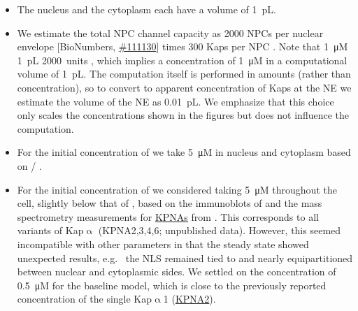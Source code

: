 \documentclass[12pt,notitlepage]{article}
\def\[#1\]{\begin{align}#1\end{align}}
\begin{document}
\begin{itemize}

\item

The nucleus and the cytoplasm each have a volume
of \SI{1}{\pico L}.


\item

We estimate the total NPC channel capacity
as 
2000 NPCs per nuclear envelope
[BioNumbers, \href{https://bionumbers.hms.harvard.edu/bionumber.aspx?id=111130}{\#111130}]
times
300 Kaps per NPC
\cite[\href{https://i.ibb.co/8jdLvn1/Paradise-Levin-Korza-Carson-2007-Fig7.jpg}{Fig.~7}]{ParadiseETAL2007}.
%
%
Note that 
\[
	\label{e:NPC-volume}
	\SI{1}{\micro M} \times \SI{1}{\pico L} 
	 \times \SI{2000}{units}
	,	
\]
which implies a concentration of \SI{1}{\micro M}
in a computational volume of \SI{1}{\pico L}.
%
%
%
The computation itself is performed in amounts
(rather than concentration),
so to convert to apparent concentration
of Kaps at the NE
we estimate
the volume of the NE as \SI{0.01}{\pico L}.
%
We emphasize that this choice only scales
the concentrations 
shown in the figures
but does not influence the computation.


\item

For the initial concentration of 
we take
\SI{5}{\micro M}
in nucleus and cytoplasm
based on
\cite[\href{https://i.ibb.co/1mNP2XT/Kalita-Kapinos-Lim2021-Fig4.png}{Fig.~4}]{KalitaKapinosLim2021} / 
\cite[\href{https://i.ibb.co/0nLsTZv/Screenshot-from-2022-01-28-15-03-10.png}{Fig.~4a}]{NguyenPappireddiWuhr2019}.
%



\item

For the initial concentration of 
we considered taking
\SI{5}{\micro M} throughout the cell,
slightly below that of ,
based on
%
the immunoblots of
\cite[\href{https://i.ibb.co/1z0YJ0T/Screenshot-from-2022-01-28-10-49-23.png}{Fig.~7}]{ZienkiewiczETAL2013}
%
and the mass spectrometry measurements for 
\href{https://www.genecards.org/Search/Symbol?queryString=KPNA*}{KPNAs}
from
\cite[Table~S5]{WuhrETAL2014}.
%
This corresponds to all variants of Kap$\upalpha$ (KPNA2,3,4,6; unpublished data).
%
%
However,
this seemed incompatible with other parameters
in that the steady state showed unexpected results,
e.g.~%
the NLS remained tied to 
and nearly equipartitioned between nuclear and cytoplasmic sides.
%
%
We settled on the  concentration of \SI{0.5}{\micro M}
for the baseline model,
which is close to the previously reported concentration
of the single Kap$\upalpha$1 (\href{https://www.genecards.org/cgi-bin/carddisp.pl?gene=KPNA2}{KPNA2}).


\end{itemize}
\end{document}
